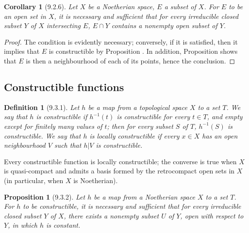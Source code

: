 \documentclass[oneside]{amsart}
\theoremstyle{ega-env-style}
\theoremstyle{ega-thm-env-style}
\newtheorem*{proposition}{Proposition}
\newtheorem*{corollary}{Corollary}
\theoremstyle{ega-defn-env-style}
\newtheorem*{definition}{Definition}
\let\EGAOriginalLabel\label
\renewcommand{\label}[1]{\phantomsection\EGAOriginalLabel{#1}}
\begin{document}
\begin{corollary}[9.2.6]
\label{0.9.2.6}
Let $X$ be a Noetherian space, $E$ a subset of $X$.
For $E$ to be an open set in $X$, it is necessary and sufficient that for every irreducible closed subset $Y$ of $X$ intersecting $E$, $E\cap Y$ contains a nonempty open subset of $Y$.
\end{corollary}

\begin{proof}
The condition is evidently necessary; conversely, if it is satisfied, then it implies that $E$ is constructible by Proposition .
In addition, Proposition  shows that $E$ is then a neighbourhood of each of its points, hence the conclusion.
\end{proof}

\subsection{Constructible functions}
\label{subsection:0.9.3}

\begin{definition}[9.3.1]
\label{0.9.3.1}
Let $h$ be a map from a topological space $X$ to a set $T$.
We say that $h$ is \emph{constructible} if $h^{-1}(t)$ is constructible for every $t\in T$, and empty except for finitely many values of $t$; then for every subset $S$ of $T$, $h^{-1}(S)$ is constructible.
We say that $h$ is \emph{locally constructible} if every $x\in X$ has an open neighbourhood $V$ such that $h|V$ is constructible.
\end{definition}

Every constructible function is locally constructible; the converse is true when $X$ is quasi-compact and admits a basis formed by the retrocompact open sets in $X$ (in particular, when $X$ is Noetherian).

\begin{proposition}[9.3.2]
\label{0.9.3.2}
Let $h$ be a map from a Noetherian space $X$ to a set $T$.
For $h$ to be constructible, it is necessary and sufficient that for every irreducible closed subset $Y$ of $X$, there exists a nonempty subset $U$ of $Y$, open with respect to $Y$, in which $h$ is constant.
\end{proposition}
\end{document}
